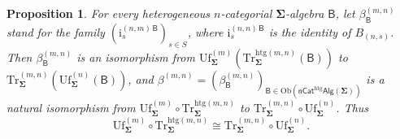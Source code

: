 \documentclass[a4paper, reqno]{amsbook}
\newcommand{\sig}[1]{\mathbf{#1}}             %
\newcommand{\calg}[1]{\boldsymbol{\mathsf{#1}}} %
\newcommand{\htg}{\mathrm{htg}}                %
\newcommand{\Uf}{\mathrm{Uf}}
\newcommand{\Tr}{\mathrm{Tr}}
\theoremstyle{plain}
\newtheorem{proposition}[theorem]{Proposition}
\theoremstyle{definition}
\begin{document}
\begin{proposition}\label{PCompatUfTr}
For every heterogeneous $n$-categorial $\sig{\Sigma}$-algebra $\calg{B}$, let $\beta^{(m,n)}_{\calg{B}}$ stand for the family $(\mathrm{i}^{(n,m)\,\calg{B}}_{s})_{s\in S}$, where $\mathrm{i}^{(n,n)\,\calg{B}}_{s}$ is the identity of $B_{(n,s)}$.
Then $\beta^{(m,n)}_{\calg{B}}$ is an isomorphism from $\Uf^{(m)}_{\sig{\Sigma}}(\Tr^{\htg(m,n)}_{\sig{\Sigma}}(\calg{B}))$ to $\Tr^{(m,n)}_{\sig{\Sigma}}(\Uf^{(n)}_{\sig{\Sigma}}(\calg{B}))$, and $\beta^{(m,n)}=(\beta^{(m,n)}_{\calg{B}})_{\calg{B}\in\mathrm{Ob}(\mathsf{nCat}^{\htg}\mathsf{Alg}(\sig{\Sigma}))}$ is a natural isomorphism from $\Uf^{(m)}_{\sig{\Sigma}}\circ \Tr^{\htg(m,n)}_{\sig{\Sigma}}$ to $\Tr^{(m,n)}_{\sig{\Sigma}}\circ\Uf^{(n)}_{\sig{\Sigma}}$.
Thus
$$
\Uf^{(m)}_{\sig{\Sigma}}\circ \Tr^{\htg(m,n)}_{\sig{\Sigma}}\cong \Tr^{(m,n)}_{\sig{\Sigma}}\circ\Uf^{(n)}_{\sig{\Sigma}}.
$$
\end{proposition}
\end{document}
